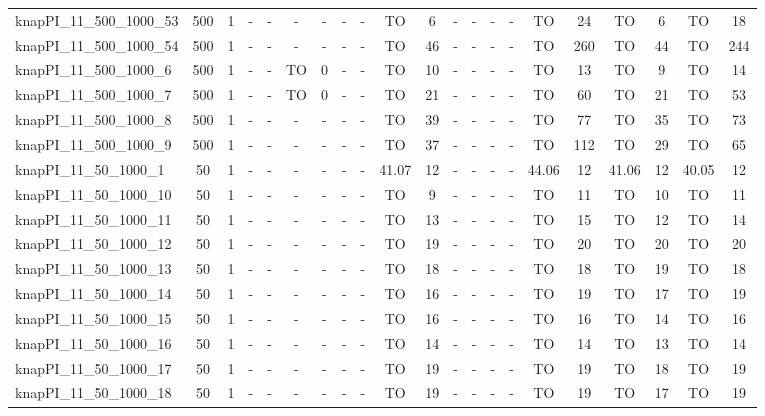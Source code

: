 \begin{sidewaystable}[!ht]
{\begin{tabular}{lcccccccccccccccccccc}
knapPI\_11\_500\_1000\_53 & 500 & 1 &  - &  - &  - &  - &  - &  - & TO & 6 &  - &  - &  - &  - & TO & 24 & TO & 6 & TO & 18 \\
knapPI\_11\_500\_1000\_54 & 500 & 1 &  - &  - &  - &  - &  - &  - & TO & 46 &  - &  - &  - &  - & TO & 260 & TO & 44 & TO & 244 \\
knapPI\_11\_500\_1000\_6 & 500 & 1 &  - &  - & TO & 0 &  - &  - & TO & 10 &  - &  - &  - &  - & TO & 13 & TO & 9 & TO & 14 \\
knapPI\_11\_500\_1000\_7 & 500 & 1 &  - &  - & TO & 0 &  - &  - & TO & 21 &  - &  - &  - &  - & TO & 60 & TO & 21 & TO & 53 \\
knapPI\_11\_500\_1000\_8 & 500 & 1 &  - &  - &  - &  - &  - &  - & TO & 39 &  - &  - &  - &  - & TO & 77 & TO & 35 & TO & 73 \\
knapPI\_11\_500\_1000\_9 & 500 & 1 &  - &  - &  - &  - &  - &  - & TO & 37 &  - &  - &  - &  - & TO & 112 & TO & 29 & TO & 65 \\
knapPI\_11\_50\_1000\_1 & 50 & 1 &  - &  - &  - &  - &  - &  - & 41.07 & 12 &  - &  - &  - &  - & 44.06 & 12 & 41.06 & 12 & 40.05 & 12 \\
knapPI\_11\_50\_1000\_10 & 50 & 1 &  - &  - &  - &  - &  - &  - & TO & 9 &  - &  - &  - &  - & TO & 11 & TO & 10 & TO & 11 \\
knapPI\_11\_50\_1000\_11 & 50 & 1 &  - &  - &  - &  - &  - &  - & TO & 13 &  - &  - &  - &  - & TO & 15 & TO & 12 & TO & 14 \\
knapPI\_11\_50\_1000\_12 & 50 & 1 &  - &  - &  - &  - &  - &  - & TO & 19 &  - &  - &  - &  - & TO & 20 & TO & 20 & TO & 20 \\
knapPI\_11\_50\_1000\_13 & 50 & 1 &  - &  - &  - &  - &  - &  - & TO & 18 &  - &  - &  - &  - & TO & 18 & TO & 19 & TO & 18 \\
knapPI\_11\_50\_1000\_14 & 50 & 1 &  - &  - &  - &  - &  - &  - & TO & 16 &  - &  - &  - &  - & TO & 19 & TO & 17 & TO & 19 \\
knapPI\_11\_50\_1000\_15 & 50 & 1 &  - &  - &  - &  - &  - &  - & TO & 16 &  - &  - &  - &  - & TO & 16 & TO & 14 & TO & 16 \\
knapPI\_11\_50\_1000\_16 & 50 & 1 &  - &  - &  - &  - &  - &  - & TO & 14 &  - &  - &  - &  - & TO & 14 & TO & 13 & TO & 14 \\
knapPI\_11\_50\_1000\_17 & 50 & 1 &  - &  - &  - &  - &  - &  - & TO & 19 &  - &  - &  - &  - & TO & 19 & TO & 18 & TO & 19 \\
knapPI\_11\_50\_1000\_18 & 50 & 1 &  - &  - &  - &  - &  - &  - & TO & 19 &  - &  - &  - &  - & TO & 19 & TO & 17 & TO & 19 \\

\end{tabular}}
\end{sidewaystable}
